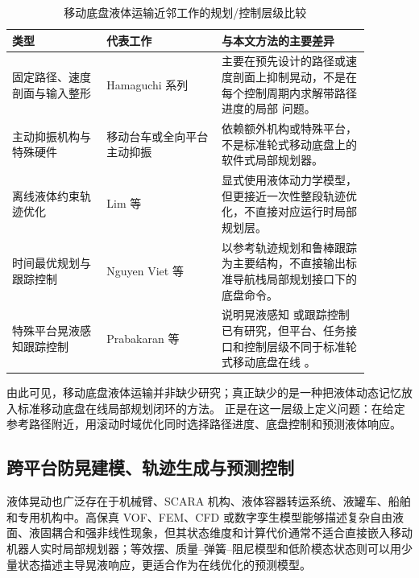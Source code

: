 \begin{table}[t]
  \centering
  \small
  \setlength{\tabcolsep}{4pt}
  \caption{移动底盘液体运输近邻工作的规划/控制层级比较}
  \label{tab:mobile_base_related_work_framework}
  \begin{tabular}{p{0.23\linewidth} p{0.29\linewidth} p{0.36\linewidth}}
    \toprule
    类型 & 代表工作 & 与本文方法的主要差异 \\
    \midrule
    固定路径、速度剖面与输入整形 & Hamaguchi 系列\cite{B04_Hamaguchi2002,B03_Hamaguchi2004,B02_Hamaguchi2005} & 主要在预先设计的路径或速度剖面上抑制晃动，不是在每个控制周期内求解带路径进度的局部 \MPCC{} 问题。 \\
    主动抑振机构与特殊硬件 & 移动台车或全向平台主动抑振\cite{B05_Hamaguchi2019,B06_Hamaguchi2018} & 依赖额外机构或特殊平台，不是标准轮式移动底盘上的软件式局部规划器。 \\
    离线液体约束轨迹优化 & Lim 等\cite{B01_Lim2024} & 显式使用液体动力学模型，但更接近一次性整段轨迹优化，不直接对应运行时局部规划层。 \\
    时间最优规划与跟踪控制 & Nguyen Viet 等\cite{B11_Viet2025} & 以参考轨迹规划和鲁棒跟踪为主要结构，不直接输出标准导航栈局部规划接口下的底盘命令。 \\
    特殊平台晃液感知跟踪控制 & Prabakaran 等\cite{B12_Prabakaran2026} & 说明晃液感知 \MPC{} 或跟踪控制已有研究，但平台、任务接口和控制层级不同于标准轮式移动底盘在线 \MPCC{}。 \\
    \bottomrule
  \end{tabular}
\end{table}

由此可见，移动底盘液体运输并非缺少研究；真正缺少的是一种把液体动态记忆放入标准移动底盘在线局部规划闭环的方法。\SPMPC{} 正是在这一层级上定义问题：在给定参考路径附近，用滚动时域优化同时选择路径进度、底盘控制和预测液体响应。

\subsection{跨平台防晃建模、轨迹生成与预测控制}

液体晃动也广泛存在于机械臂、SCARA 机构、液体容器转运系统、液罐车、船舶和专用机构中。高保真 VOF、FEM、CFD 或数字孪生模型能够描述复杂自由液面、液固耦合和强非线性现象\cite{A03_Schrgenhumer2019,A04_Elahi2015,A05_Nicolsen2017,A06_Moya2020}，但其状态维度和计算代价通常不适合直接嵌入移动机器人实时局部规划器；等效摆、质量--弹簧--阻尼模型和低阶模态状态则可以用少量状态描述主导晃液响应，更适合作为在线优化的预测模型\cite{A02_Guagliumi2021,A01_Leva2021}。


